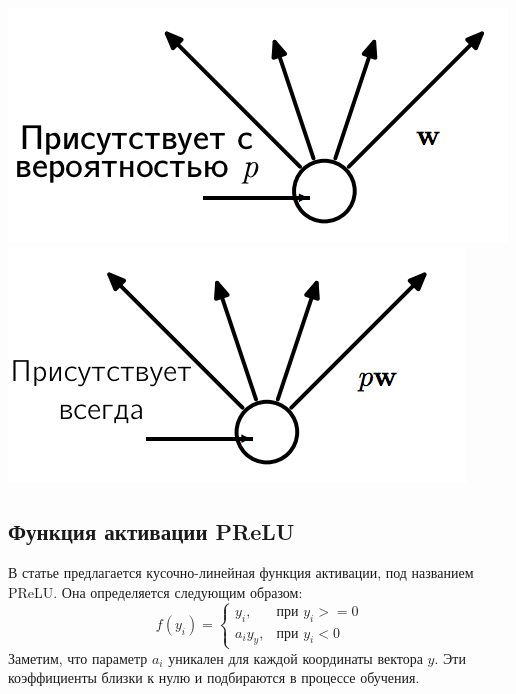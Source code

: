 \documentclass[14pt, a4paper]{extarticle}
\begin{document}
\begin{center} %
	\includegraphics[scale=0.8]{images/dropout1.png}
	\includegraphics[scale=0.8]{images/dropout2.png}
\end{center}

\subsection{Функция активации PReLU}
В статье \cite{prelu} предлагается кусочно-линейная функция активации, под названием PReLU. Она определяется следующим образом:
\begin{equation}
	f(y_i) = \begin{cases}
		y_i, & \text{при $y_i >= 0$} \\
		a_iy_y, & \text{при $y_i < 0$}
	\end{cases}
\end{equation}
Заметим, что параметр $a_i$ уникален для каждой координаты вектора $y$. Эти коэффициенты близки к нулю и подбираются в процессе обучения. 
\end{document}
